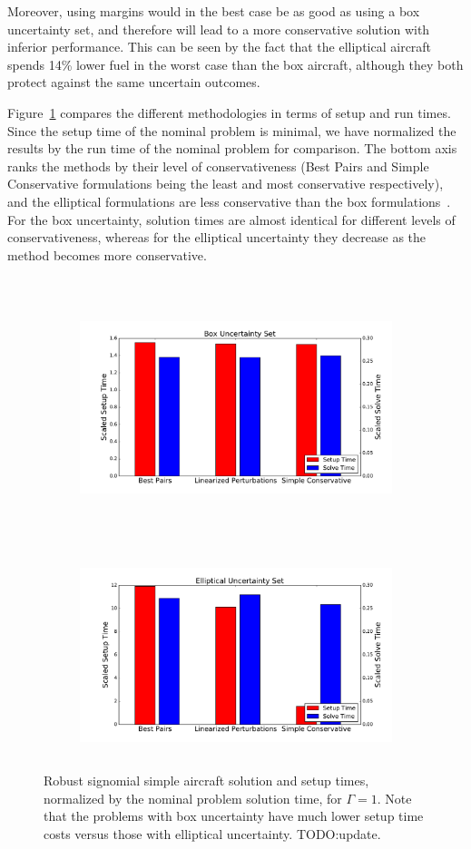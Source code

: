 Moreover, using margins would in the best case be as good as using a box uncertainty set, and therefore will lead
to a more conservative solution with inferior performance. This can be seen by the fact that
the elliptical aircraft spends 14\% lower fuel in the worst case
than the box aircraft, although they both protect against the same uncertain outcomes.

Figure~\ref{compare_signomial} compares the different methodologies in terms of setup and
run times. Since the setup time of the nominal problem is minimal, we have
normalized the results by the run time of the nominal problem for comparison.
The bottom axis ranks the methods by their level of conservativeness (Best Pairs
and Simple Conservative formulations being the least and most conservative respectively),
and the elliptical formulations are less conservative than the box formulations~\cite{Saab2018}.
For the box uncertainty, solution times are almost identical for different levels of conservativeness,
whereas for the elliptical uncertainty they decrease as the method becomes more conservative.

\ \\
\begin{figure}[ht]
    \centering
    \captionsetup{justification=centering, font=small}
    \begin{subfigure}{0.49\textwidth}
        \centering
        \includegraphics[height=2.3in]{signomial_simple_flight/box_sst.pdf}
    \end{subfigure}
    ~
    \begin{subfigure}{0.49\textwidth}
        \centering
        \includegraphics[height=2.3in]{signomial_simple_flight/ell_sst.pdf}
    \end{subfigure}
    \caption{Robust signomial simple aircraft solution and setup times, normalized by the
    nominal problem solution time, for $\Gamma = 1$.
    Note that the problems with box uncertainty have much lower setup
    time costs versus those with elliptical uncertainty. TODO:update.}
    \label{compare_signomial}
\end{figure}

